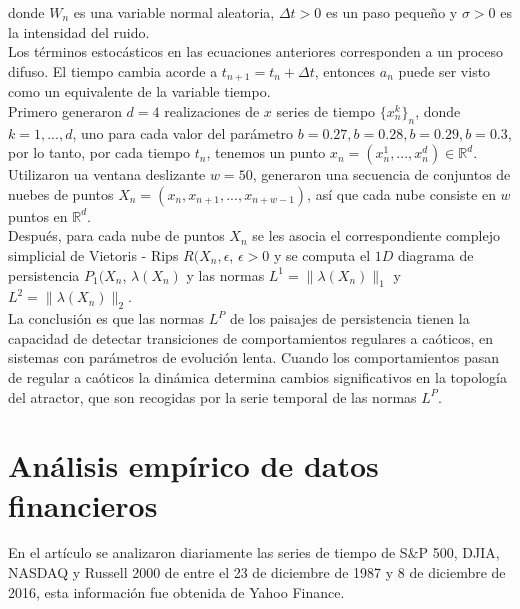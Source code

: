 \documentclass{article}
\begin{document}
donde $ W_{n} $  es una variable normal aleatoria, $ \Delta t > 0 $ es un paso pequeño y $ \sigma > 0 $ es la intensidad del ruido.\\
Los términos estocásticos en las ecuaciones anteriores corresponden a un proceso difuso. El tiempo cambia acorde a $ t_{n + 1} = t_{n} + \Delta t $, entonces $ a_{n} $ puede ser visto como un equivalente de la variable tiempo.\\
Primero generaron $ d = 4 $ realizaciones de $ x $ series de tiempo $ \{ x^{k}_{n} \}_{n} $, donde $ k = 1,...,d $, uno para cada valor del parámetro $ b = 0.27 , b = 0.28 , b = 0.29 , b = 0.3 $, por lo tanto, por cada tiempo $ t_{n} $, tenemos un punto $ x_{n} = ( x^{1}_{n},...,x^{d}_{n} ) \in \mathbb {R}^{d} $. Utilizaron ua ventana deslizante $ w = 50 $, generaron una secuencia de conjuntos de nuebes de puntos $ X_{n} = ( x_{n} , x_{n + 1} ,..., x_{n + w - 1} ) $, así que cada nube consiste en $ w $ puntos en $ \mathbb{R}^{d} $.\\
Después, para cada nube de puntos $ X_{n} $ se les asocia el correspondiente complejo simplicial de Vietoris - Rips $ R ( X_{n}, \epsilon $, $ \epsilon > 0 $ y se computa el $ 1D $ diagrama de persistencia $ P_{1} ( X_{n} $, $ \lambda ( X_{n} ) $ y las normas $ L^{1} = \parallel \lambda ( X_{n} ) \parallel_{1} $ y $ L^{2} = \parallel \lambda ( X_{n} ) \parallel_{2} $.\\
La conclusión es que las normas $ L^{P} $ de los paisajes de persistencia tienen la capacidad de detectar transiciones de comportamientos regulares a caóticos, en sistemas con parámetros de evolución lenta. Cuando los comportamientos pasan de regular a caóticos la dinámica determina cambios significativos en la topología del atractor, que son recogidas por la serie temporal de las normas $ L^{P} $.

\maketitle

\section{Análisis empírico de datos financieros}

En el artículo se analizaron diariamente las series de tiempo de S&P 500, DJIA, NASDAQ y Russell 2000 de entre el 23 de diciembre de 1987 y 8 de diciembre de 2016, esta información fue obtenida de Yahoo Finance.\\
\end{document}
